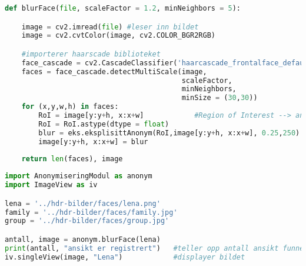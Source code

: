 \begin{lstlisting}[language=Python]
def blurFace(file, scaleFactor = 1.2, minNeighbors = 5):

    image = cv2.imread(file) #leser inn bildet
    image = cv2.cvtColor(image, cv2.COLOR_BGR2RGB)

    #importerer haarscade biblioteket
    face_cascade = cv2.CascadeClassifier('haarcascade_frontalface_default.xml')  
    faces = face_cascade.detectMultiScale(image,
                                          scaleFactor,
                                          minNeighbors,
                                          minSize = (30,30))
    for (x,y,w,h) in faces:
        RoI = image[y:y+h, x:x+w]            #Region of Interest --> ansiktet
        RoI = RoI.astype(dtype = float)
        blur = eks.eksplisittAnonym(RoI,image[y:y+h, x:x+w], 0.25,250)               
        image[y:y+h, x:x+w] = blur
        
    return len(faces), image
    \end{lstlisting}

\begin{lstlisting}[language=Python]  
import AnonymiseringModul as anonym
import ImageView as iv

lena = '../hdr-bilder/faces/lena.png'
family = '../hdr-bilder/faces/family.jpg'
group = '../hdr-bilder/faces/group.jpg'

antall, image = anonym.blurFace(lena)
print(antall, "ansikt er registrert")   #teller opp antall ansikt funnet
iv.singleView(image, "Lena")            #displayer bildet
\end{lstlisting}


    